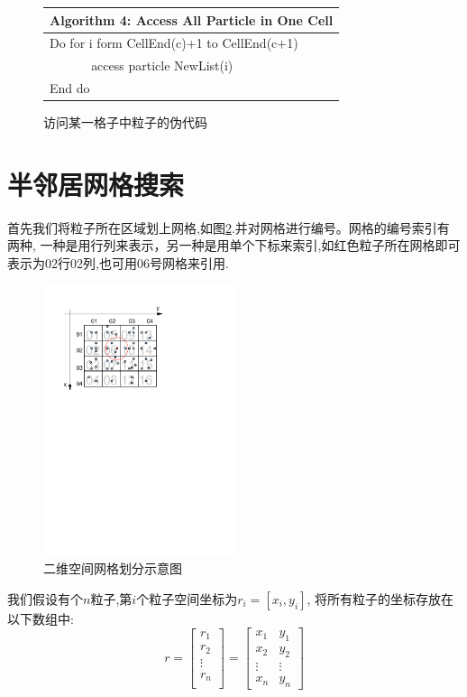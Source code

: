 \documentclass[a4paper]{article}
\begin{document}
\begin{figure}[!htb]
\centering
\begin{tabular}{lll}
\hline
\multicolumn{3}{|l|}{Algorithm 4:  Access All Particle in One Cell} \\
\hline
\multicolumn{3}{|l|}{Do for i form CellEnd(c)+1 to CellEnd(c+1)} \\
\multicolumn{1}{|l}{} &  & \multicolumn{1}{l|}{access particle NewList(i)} \\
\multicolumn{3}{|l|}{End do} \\
\hline
\end{tabular}
\caption{\label{Alg4}访问某一格子中粒子的伪代码}
\end{figure}


\section{半邻居网格搜索}


首先我们将粒子所在区域划上网格,如图\ref{cell}.并对网格进行编号。网格的编号索引有两种,
一种是用行列来表示，另一种是用单个下标来索引,如红色粒子所在网格即可表示为02行02列,也可用06号网格来引用.

\begin{figure}[!htb]
\centering
\includegraphics[width=0.5\textwidth]{fig02.pdf}
\caption{\label{cell} 二维空间网格划分示意图}
\end{figure}

我们假设有个$n$粒子,第$i$个粒子空间坐标为$r_i=[x_i, y_i]$, 将所有粒子的坐标存放在以下数组中:
\[
r =\left[
     \begin{array}{c}
       r_1 \\
       r_2 \\
       \vdots \\
       r_n \\
     \end{array}
   \right]=
\left[
\begin{array}{cc}
  x_1 & y_1 \\
  x_2 & y_2 \\
  \vdots & \vdots \\
  x_n & y_n
\end{array}\right]
\]
\end{document}
